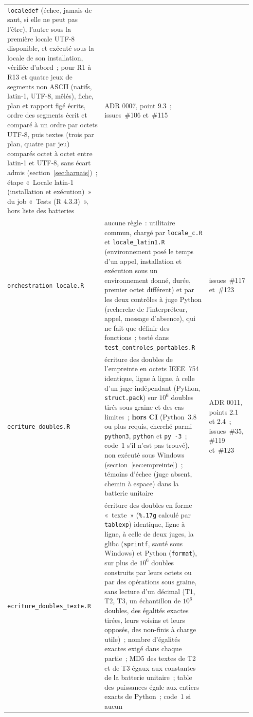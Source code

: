 \documentclass[a4paper,11pt]{article}
\newcommand{\code}[1]{\texttt{\small #1}}
\begin{document}
\begin{center}
\begin{longtable}{@{}p{4.6cm}p{7.4cm}p{2.8cm}@{}}
\code{localedef} (échec, jamais de saut, si elle ne peut pas l'être), l'autre
sous la première locale UTF-8 disponible, et exécuté sous la locale de son
installation, vérifiée d'abord~; pour R1 à R13 et quatre jeux de segments non
ASCII (natifs, latin-1, UTF-8, mêlés), fiche, plan et rapport figé écrits,
ordre des segments écrit et comparé à un ordre par octets UTF-8, puis
textes (trois par plan, quatre par jeu) comparés octet à octet entre latin-1 et UTF-8, sans écart admis
(section~\ref{sec:harnais})~; étape «~Locale latin-1 (installation et
exécution)~» du job «~Tests (R 4.3.3)~», hors liste des batteries &
ADR 0007, point 9.3~; issues~\#106 et~\#115 \\
\code{orchestration\_}\newline\code{locale.R} & aucune règle~:
utilitaire commun, chargé par \code{locale\_c.R} et
\code{locale\_latin1.R} (environnement posé le temps d'un appel,
installation et exécution sous un environnement donné, durée, premier
octet différent) et par les deux contrôles à juge Python (recherche de
l'interpréteur, appel, message d'absence), qui ne fait que définir des
fonctions~; testé dans \code{test\_controles\_portables.R} & issues~\#117
et~\#123 \\
\code{ecriture\_doubles.R} & écriture des doubles de l'empreinte en octets
IEEE~754 identique, ligne à ligne, à celle d'un juge indépendant (Python,
\code{struct.pack}) sur $10^6$ doubles tirés sous graine et des cas limites~;
\textbf{hors CI} (Python~3.8 ou plus requis, cherché parmi \code{python3},
\code{python} et \code{py -3}~; code~1 s'il n'est pas trouvé), non exécuté
sous Windows (section~\ref{sec:empreinte})~; témoins d'échec (juge absent,
chemin à espace) dans la batterie unitaire & ADR 0011, points 2.1 et 2.4~;
issues~\#35, \#119 et~\#123 \\
\code{ecriture\_doubles\_}\newline\code{texte.R} & écriture des doubles en
forme «~texte~» (\code{\%.17g} calculé par \code{tablexp}) identique, ligne
à ligne, à celle de deux juges, la glibc (\code{sprintf}, sauté sous
Windows) et Python (\code{format}), sur plus de $10^{6}$ doubles construits
par leurs octets ou par des opérations sous graine, sans lecture d'un
décimal (T1, T2, T3, un échantillon de $10^{6}$ doubles, des égalités
exactes tirées, leurs voisins et leurs opposés, des non-finis à charge
utile)~; nombre d'égalités exactes exigé dans chaque partie~; MD5 des textes
de T2 et de T3 égaux aux constantes de la batterie unitaire~; table des
puissances égale aux entiers exacts de Python~; code~1 si aucun

\end{longtable}
\end{center}
\end{document}
